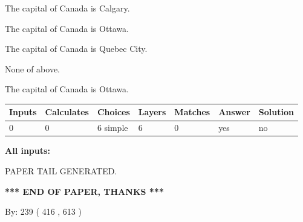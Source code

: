\documentclass[12pt]{article}
\begin{document}
 
The capital of Canada is Calgary.
 
 
The capital of Canada is Ottawa.
 
 
The capital of Canada is Quebec City.
 
 
 None of above.
 
 
\noindent{}
 
 
The capital of Canada is Ottawa.
 
 
\noindent{}
 
 
   
   
   
   
\noindent\begin{tabular}{|l|l|l|l|l|l|l|}
 \hline
Inputs & Calculates & Choices & Layers & Matches & Answer & Solution \\ \hline
 0  & 
 0  & 
 6
  simple  
  & 
 6  & 
 0  & 
  yes & 
  no 
  \\ \hline
 \end{tabular}
   
   
   
   
\noindent{}
   
   
   
   
\noindent\vspace{0.1in}\hspace{-0.08in} {\textbf{\Large{All inputs: }}}
   
   
   
   
   
   
 \vspace{0.2in}
 
   
   
\vspace{2.0in} PAPER TAIL GENERATED.
   
   
   
   
\vspace{1.0in} 
{\textbf{\large{ *** END OF PAPER, THANKS *** }}} 
   
   
\hspace{1.0in} By: 
 239 ( 416 ,  613 )
   
   
   
   
\newpage 
\setcounter{page}{ 
   484001 } 
   
\end{document}
